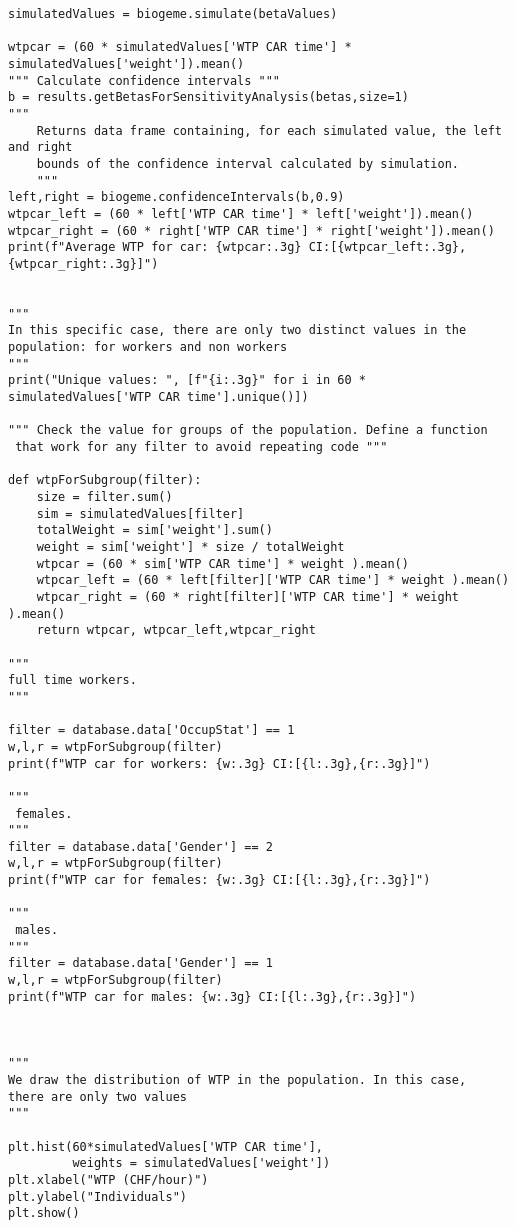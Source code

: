\documentclass[12pt,a4paper]{article}
\begin{document}
\begin{lstlisting}[style=numbers]
simulatedValues = biogeme.simulate(betaValues)

wtpcar = (60 * simulatedValues['WTP CAR time'] * simulatedValues['weight']).mean()
""" Calculate confidence intervals """
b = results.getBetasForSensitivityAnalysis(betas,size=1)
"""
    Returns data frame containing, for each simulated value, the left and right 
    bounds of the confidence interval calculated by simulation. 
    """
left,right = biogeme.confidenceIntervals(b,0.9)
wtpcar_left = (60 * left['WTP CAR time'] * left['weight']).mean()
wtpcar_right = (60 * right['WTP CAR time'] * right['weight']).mean()
print(f"Average WTP for car: {wtpcar:.3g} CI:[{wtpcar_left:.3g},{wtpcar_right:.3g}]")


""" 
In this specific case, there are only two distinct values in the
population: for workers and non workers
"""
print("Unique values: ", [f"{i:.3g}" for i in 60 * simulatedValues['WTP CAR time'].unique()])

""" Check the value for groups of the population. Define a function
 that work for any filter to avoid repeating code """

def wtpForSubgroup(filter):
    size = filter.sum()
    sim = simulatedValues[filter]
    totalWeight = sim['weight'].sum()
    weight = sim['weight'] * size / totalWeight
    wtpcar = (60 * sim['WTP CAR time'] * weight ).mean()
    wtpcar_left = (60 * left[filter]['WTP CAR time'] * weight ).mean()
    wtpcar_right = (60 * right[filter]['WTP CAR time'] * weight ).mean()
    return wtpcar, wtpcar_left,wtpcar_right
    
"""
full time workers. 
"""

filter = database.data['OccupStat'] == 1
w,l,r = wtpForSubgroup(filter)
print(f"WTP car for workers: {w:.3g} CI:[{l:.3g},{r:.3g}]")

"""
 females. 
"""
filter = database.data['Gender'] == 2
w,l,r = wtpForSubgroup(filter)
print(f"WTP car for females: {w:.3g} CI:[{l:.3g},{r:.3g}]")

"""
 males. 
"""
filter = database.data['Gender'] == 1
w,l,r = wtpForSubgroup(filter)
print(f"WTP car for males: {w:.3g} CI:[{l:.3g},{r:.3g}]")



""" 
We draw the distribution of WTP in the population. In this case,
there are only two values 
"""

plt.hist(60*simulatedValues['WTP CAR time'],
         weights = simulatedValues['weight'])
plt.xlabel("WTP (CHF/hour)")
plt.ylabel("Individuals")
plt.show()
\end{lstlisting}






\clearpage 



\end{document}
